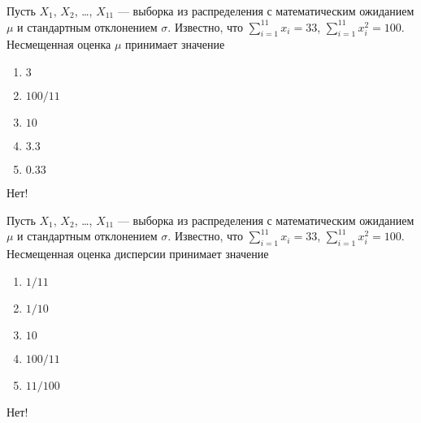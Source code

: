 \documentclass[t]{beamer}
\begin{document}
 \begin{frame} \label{33-No} 
\begin{block}{33} 

Пусть $X_1$, $X_2$, \ldots, $X_{11}$ — выборка из распределения с математическим ожиданием $\mu$ и стандартным отклонением $\sigma$. Известно, что $\sum_{i=1}^{11}x_i=33$, $\sum_{i=1}^{11}x_i^2=100$. Несмещенная оценка $\mu$ принимает значение
 


 \end{block} 
\begin{enumerate} 
\item[] \hyperlink{33-Yes}{\beamergotobutton{} $3$}
\item[] \hyperlink{33-No}{\beamergotobutton{} $100/11$}
\item[] \hyperlink{33-No}{\beamergotobutton{} $10$}
\item[] \hyperlink{33-No}{\beamergotobutton{} $3.3$}
\item[] \hyperlink{33-No}{\beamergotobutton{} $0.33$}
\end{enumerate} 

 \alert{Нет!} 
\end{frame} 


 \begin{frame} \label{34-No} 
\begin{block}{34} 

Пусть $X_1$, $X_2$, \ldots, $X_{11}$ — выборка из распределения с математическим ожиданием $\mu$ и стандартным отклонением $\sigma$. Известно, что $\sum_{i=1}^{11}x_i=33$, $\sum_{i=1}^{11}x_i^2=100$. Несмещенная оценка дисперсии принимает значение
 


 \end{block} 
\begin{enumerate} 
\item[] \hyperlink{34-No}{\beamergotobutton{} $1/11$}
\item[] \hyperlink{34-Yes}{\beamergotobutton{} $1/10$}
\item[] \hyperlink{34-No}{\beamergotobutton{} $10$}
\item[] \hyperlink{34-No}{\beamergotobutton{} $100/11$}
\item[] \hyperlink{34-No}{\beamergotobutton{} $11/100$}
\end{enumerate} 

 \alert{Нет!} 
\end{frame} 
\end{document}
